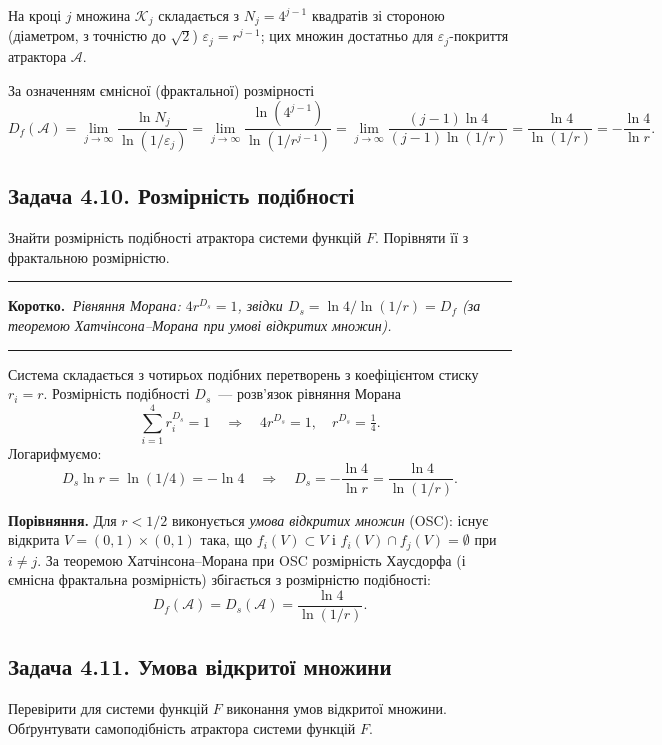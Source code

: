 \documentclass[12pt,a4paper]{article}
\newenvironment{korotko}
  {\par\medskip\noindent\begingroup\color{accent!75!black}\rule{\linewidth}{0.4pt}\par
   \noindent\textbf{Коротко.}\itshape\,}
  {\par\noindent\rule{\linewidth}{0.4pt}\endgroup\medskip}
\begin{document}
На кроці $j$ множина $\mathcal{K}_j$ складається з $N_j=4^{j-1}$ квадратів зі
стороною (діаметром, з точністю до $\sqrt2$) $\varepsilon_j=r^{j-1}$; цих множин
достатньо для $\varepsilon_j$-покриття атрактора $\mathcal{A}$.

За означенням ємнісної (фрактальної) розмірності
\begin{equation*}
  D_f(\mathcal{A})
  =\lim_{j\to\infty}\frac{\ln N_j}{\ln(1/\varepsilon_j)}
  =\lim_{j\to\infty}\frac{\ln(4^{j-1})}{\ln(1/r^{j-1})}
  =\lim_{j\to\infty}\frac{(j-1)\ln4}{(j-1)\ln(1/r)}
  =\frac{\ln4}{\ln(1/r)}=-\frac{\ln4}{\ln r}.
\end{equation*}

\subsection{Задача 4.10. Розмірність подібності}
Знайти розмірність подібності атрактора системи функцій $F$. Порівняти її
з фрактальною розмірністю.

\begin{korotko}
Рівняння Морана: $4r^{D_s}=1$, звідки $D_s=\ln4/\ln(1/r)=D_f$ (за теоремою
Хатчінсона--Морана при умові відкритих множин).
\end{korotko}

Система складається з чотирьох подібних перетворень з коефіцієнтом стиску $r_i=r$.
Розмірність подібності $D_s$~--- розв'язок рівняння Морана
\begin{equation*}
  \sum_{i=1}^{4}r_i^{D_s}=1 \quad\Longrightarrow\quad 4r^{D_s}=1,\quad
  r^{D_s}=\tfrac14.
\end{equation*}
Логарифмуємо:
\begin{equation*}
  D_s\ln r=\ln(1/4)=-\ln4 \quad\Longrightarrow\quad
  D_s=-\frac{\ln4}{\ln r}=\frac{\ln4}{\ln(1/r)}.
\end{equation*}

\textbf{Порівняння.}
Для $r<1/2$ виконується \emph{умова відкритих множин} (OSC): існує відкрита
$V=(0,1)\times(0,1)$ така, що $f_i(V)\subset V$ і $f_i(V)\cap f_j(V)=\emptyset$
при $i\neq j$. За теоремою Хатчінсона--Морана при OSC розмірність Хаусдорфа
(і ємнісна фрактальна розмірність) збігається з розмірністю подібності:
\begin{equation*}
  D_f(\mathcal{A})=D_s(\mathcal{A})=\frac{\ln4}{\ln(1/r)}.
\end{equation*}

\subsection{Задача 4.11. Умова відкритої множини}
Перевірити для системи функцій $F$ виконання умов відкритої множини.
Обґрунтувати самоподібність атрактора системи функцій $F$.
\end{document}

